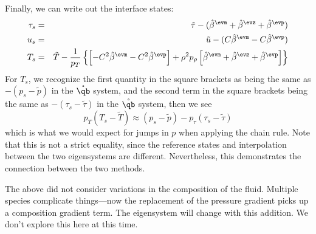 Finally, we can write out the interface states:
\begin{eqnarray}
\tau_s &=& \tilde{\tau} - (\hat{\beta}^\evm + \hat{\beta}^\evz + \hat{\beta}^\evp) \\
%
u_s &=& \tilde{u} - (C \hat{\beta}^\evm - C \hat{\beta}^\evp) \\
%
T_s &=& \tilde{T} - \frac{1}{p_T} \left \{
   \left [ -C^2 \hat{\beta}^\evm - C^2 \hat{\beta}^\evp \right ] +
   \rho^2 p_\rho \left [ \hat{\beta}^\evm + \hat{\beta}^\evz + \hat{\beta}^\evp \right ] \right \}
\end{eqnarray}
For $T_s$, we recognize the first quantity in the square brackets as
being the same as $-(p_s - \tilde{p})$ in the $\mathring{\qb}$ system, and the
second term in the square brackets being the same as $-(\tau_s - \tilde{\tau})$
in the $\mathring{\qb}$ system, then we see
\begin{equation}
p_T (T_s - \tilde{T} ) \approx (p_s - \tilde{p} ) - p_\tau (\tau_s - \tilde{\tau})
\end{equation}
which is what we would expect for jumps in $p$ when applying the chain
rule.  Note that this is not a strict equality, since the reference
states and interpolation between the two eigensystems are different.
Nevertheless, this demonstrates the connection between the two
methods.

The above did not consider variations in the composition of the fluid.
Multiple species complicate things---now the replacement of the
pressure gradient picks up a composition gradient term.
The eigensystem will change with this addition.  We don't explore this here at this
time.
\fi
